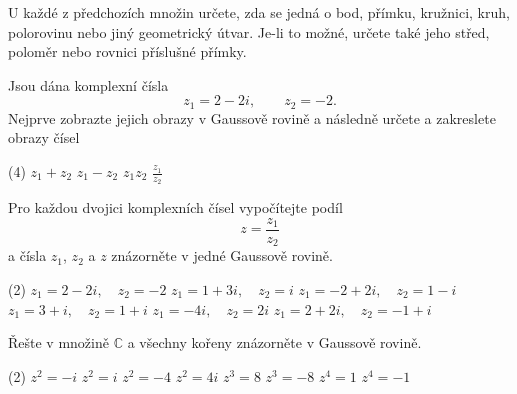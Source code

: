 \begin{exercise}{U každé z předchozích množin určete, zda se jedná o bod, přímku, kružnici, kruh, polorovinu nebo jiný geometrický útvar. Je-li to možné, určete také jeho střed, poloměr nebo rovnici příslušné přímky.}
\end{exercise}



\begin{exercise}{Jsou dána komplexní čísla
\[
    z_1=2-2i,
    \qquad
    z_2=-2.
\]
Nejprve zobrazte jejich obrazy v Gaussově rovině a následně určete a zakreslete obrazy čísel}
    \begin{tasks}(4)
        \task $z_1+z_2$
        \task $z_1-z_2$
        \task $z_1z_2$
        \task $\displaystyle \frac{z_1}{z_2}$
    \end{tasks}
\end{exercise}


\begin{exercise}{Pro každou dvojici komplexních čísel vypočítejte podíl
\[
    z=\frac{z_1}{z_2}
\]
a čísla $z_1$, $z_2$ a $z$ znázorněte v jedné Gaussově rovině.}

    \begin{tasks}(2)
        \task $z_1=2-2i,\quad z_2=-2$
        \task $z_1=1+3i,\quad z_2=i$
        \task $z_1=-2+2i,\quad z_2=1-i$
        \task $z_1=3+i,\quad z_2=1+i$
        \task $z_1=-4i,\quad z_2=2i$
        \task $z_1=2+2i,\quad z_2=-1+i$
    \end{tasks}
\end{exercise}



\begin{exercise}{Řešte v množině $\mathbb{C}$ a všechny kořeny znázorněte v Gaussově rovině.}
    \begin{tasks}(2)
        \task $z^2=-i$
        \task $z^2=i$
        \task $z^2=-4$
        \task $z^2=4i$
        \task $z^3=8$
        \task $z^3=-8$
        \task $z^4=1$
        \task $z^4=-1$
    \end{tasks}
\end{exercise}



